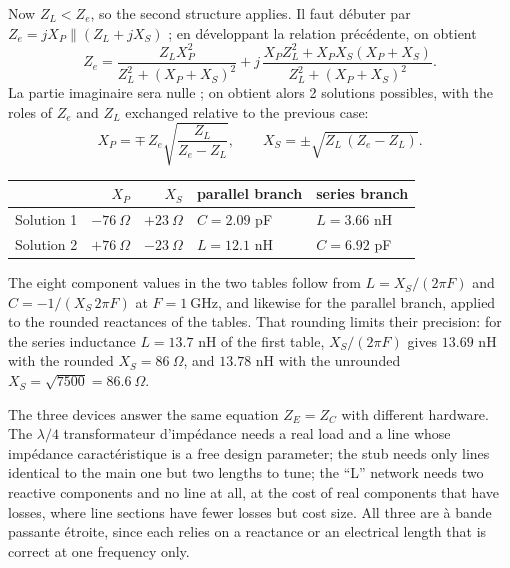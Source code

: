 \begin{example}[$Z_L = 35\ \Omega$ adapté to $Z_e = 50\ \Omega$ at $1\ \mathrm{GHz}$]
  Now $Z_L < Z_e$, so the second structure applies. Il faut débuter par
  $Z_e = jX_P \parallel (Z_L + jX_S)$ ; en développant la relation précédente, on
  obtient
  \[Z_e = \frac{Z_L X_P^2}{Z_L^2 + (X_P + X_S)^2}
        + j\,\frac{X_P Z_L^2 + X_P X_S (X_P + X_S)}{Z_L^2 + (X_P + X_S)^2}.\]
  La partie imaginaire sera nulle ; on obtient alors 2 solutions possibles, with the
  roles of $Z_e$ and $Z_L$ exchanged relative to the previous case:
  \[X_P = \mp\, Z_e\sqrt{\frac{Z_L}{Z_e - Z_L}},
    \qquad X_S = \pm\sqrt{Z_L\,(Z_e - Z_L)}.\]
  \begin{center}
    \begin{tabular}{lrrll}
      \toprule
      & $X_P$ & $X_S$ & parallel branch & series branch \\
      \midrule
      Solution 1 & $-76\ \Omega$ & $+23\ \Omega$ & $C = 2.09$ pF  & $L = 3.66$ nH \\
      Solution 2 & $+76\ \Omega$ & $-23\ \Omega$ & $L = 12.1$ nH  & $C = 6.92$ pF \\
      \bottomrule
    \end{tabular}
  \end{center}
\end{example}

\begin{remark}
  The eight component values in the two tables follow from $L = X_S/(2\pi F)$ and
  $C = -1/(X_S\,2\pi F)$ at $F = 1\ \mathrm{GHz}$, and likewise for the parallel
  branch, applied to the rounded reactances of the tables. That rounding limits their
  precision: for the series inductance $L = 13.7$ nH of the first table,
  $X_S/(2\pi F)$ gives $13.69$ nH with the rounded $X_S = 86\ \Omega$, and $13.78$ nH
  with the unrounded $X_S = \sqrt{7500} = 86.6\ \Omega$.
\end{remark}

\begin{conclusion}
  The three devices answer the same equation $Z_E = Z_C$ with different hardware. The
  $\lambda/4$ transformateur d'impédance needs a real load and a line whose impédance
  caractéristique is a free design parameter; the stub needs only lines identical to
  the main one but two lengths to tune; the ``L'' network needs two reactive
  components and no line at all, at the cost of real components that have losses,
  where line sections have fewer losses but cost size. All three are à bande passante
  étroite, since each relies on a reactance or an electrical length that is correct at
  one frequency only.
\end{conclusion}

